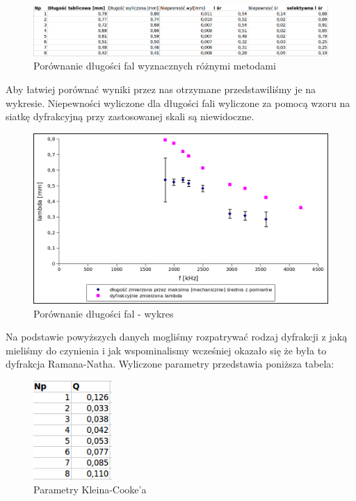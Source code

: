 \documentclass[a4paper,12pt]{article}
\begin{document}
\begin{figure} [H]
  \begin{center}
    \includegraphics[width = 17cm]{tab5.png}
    \caption{Porównanie długości fal wyznacznych różnymi metodami}
  \end{center}
\end{figure}

Aby łatwiej porównać wyniki przez nas otrzymane przedstawiliśmy je na wykresie. Niepewności wyliczone dla długości fali wyliczone za pomocą wzoru na siatkę dyfrakcyjną przy zastosowanej skali są niewidoczne. 

\begin{figure} [H]
  \begin{center}
    \includegraphics[width = 12cm]{wykres2.png}
    \caption{Porównanie długości fal - wykres}
  \end{center}
\end{figure}

Na podstawie powyższych danych mogliśmy rozpatrywać rodzaj dyfrakcji z jaką mieliśmy do czynienia i jak wspominalismy wcześniej okazało się że była to dyfrakcja Ramana-Natha. Wyliczone parametry  przedstawia poniższa tabela: 

\begin{figure} [H]
  \begin{center}
    \includegraphics[width = 3cm]{tab6.png}
    \caption{Parametry Kleina-Cooke'a}
  \end{center}
\end{figure}
\end{document}
